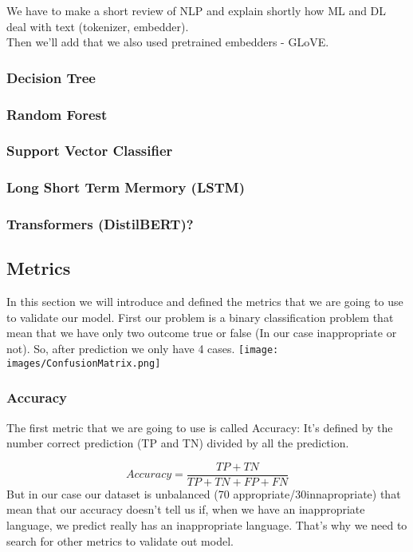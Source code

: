 \documentclass[11pt,a4paper]{article}
\begin{document}
We have to make a short review of NLP and explain shortly how ML and DL deal with text (tokenizer, embedder).\\Then we'll add that we also used pretrained embedders - GLoVE. 

\subsubsection{Decision Tree}

\subsubsection{Random Forest}

\subsubsection{Support Vector Classifier}

\subsubsection{Long Short Term Mermory (LSTM)}

\subsubsection{Transformers (DistilBERT)?}

\subsection{Metrics}
In this section we will introduce and defined the metrics that we are going to use to validate our model. 
First our problem is a binary classification problem that mean that we have only two outcome true or false (In our case inappropriate or not). 
So, after prediction we only have 4 cases.
\texttt{[image: images/ConfusionMatrix.png]}

\subsubsection{Accuracy}
The first metric that we are going to use is called Accuracy: It’s defined by the number correct prediction (TP and TN) divided by all the prediction.

\begin{equation}
Accuracy =  \frac{TP+TN}{TP+TN+FP+FN}
\end{equation}
But in our case our dataset is unbalanced (70 appropriate/30innapropriate) that mean that our accuracy doesn’t tell us if, when we have an inappropriate language, we predict really has an inappropriate language. That’s why we need to search for other metrics to validate out model.
\end{document}
